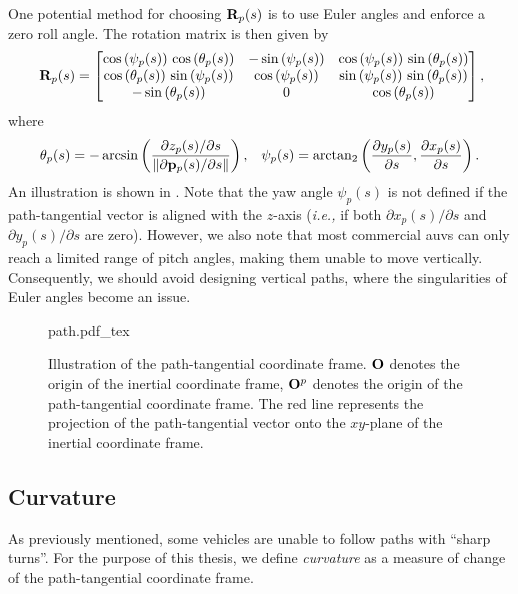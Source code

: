One potential method for choosing $\mathbf{R}_p(s)$ is to use Euler angles and enforce a zero roll angle.
The rotation matrix is then given by
\begin{equation}
    \mat{R}_p(s) =
    \begin{bmatrix}
         \cos\left(\psi_{p}(s)\right)\,\cos\left(\theta_{p}(s)\right) & -\sin\left(\psi_{p}(s)\right) & \cos\left(\psi_{p}(s)\right)\,\sin\left(\theta_{p}(s)\right) \\ \cos\left(\theta_{p}(s)\right)\,\sin\left(\psi_{p}(s)\right) & \cos\left(\psi_{p}(s)\right) & \sin\left(\psi_{p}(s)\right)\,\sin\left(\theta_{p}(s)\right) \\ -\sin\left(\theta_{p}(s)\right) & 0 & \cos\left(\theta_{p}(s)\right)
    \end{bmatrix}\mathrlap{,}
    \label{eq:background_R_p_zero_roll}
\end{equation}
where
\begin{align}
    \theta_{p}(s) &= - \arcsin\left(\frac{\partial z_p(s) / \partial s}{\left\|\partial \mathbf{p}_p(s) / \partial s\right\|}\right), &
    \psi_{p}(s) = \mathrm{arctan}_{2}\left(\frac{\partial  y_{p}(s)}{\partial s}, \frac{\partial  x_{p}(s)}{\partial s}\right).
    \label{eq:background_path_tangential_3D}
\end{align}
An illustration is shown in .
Note that the yaw angle $\psi_{p}(s)$ is not defined if the path-tangential vector is aligned with the $z$-axis (\emph{i.e.,} if both $\partial x_p(s) / \partial s$ and $\partial y_p(s) / \partial s$ are zero).
However, we also note that most commercial \glspl{auv} can only reach a limited range of pitch angles, making them unable to move vertically.
Consequently, we should avoid designing vertical paths, where the singularities of Euler angles become an issue.

\begin{figure}[t]
    \centering
    \def\svgwidth{0.6\textwidth}
    {path.pdf_tex}
    \vspace*{-1em}
    \caption{Illustration of the path-tangential coordinate frame. $\mathbf{O}$ denotes the origin of the inertial coordinate frame, $\mathbf{O}^p$ denotes the origin of the path-tangential coordinate frame. The red line represents the projection of the path-tangential vector onto the $xy$-plane of the inertial coordinate frame.}
    \label{fig:background_path}
\end{figure}

\subsection{Curvature}
As previously mentioned, some vehicles are unable to follow paths with ``sharp turns''.
For the purpose of this thesis, we define \emph{curvature} as a measure of change of the path-tangential coordinate frame.

